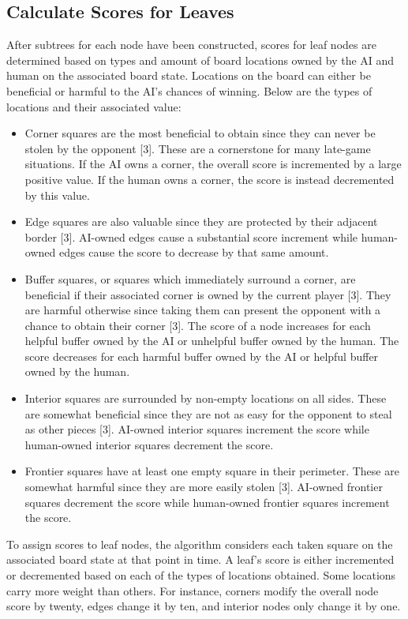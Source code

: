 \documentclass[conference]{IEEEtran}
\begin{document}
\subsection{Calculate Scores for Leaves}
After subtrees for each node have been constructed, scores for leaf nodes are determined based on types and amount of board locations owned by the AI and human on the associated board state. Locations on the board can either be beneficial or harmful to the AI’s chances of winning. Below are the types of locations and their associated value:

\begin{itemize}
\item Corner squares are the most beneficial to obtain since they can never be stolen by the opponent [3]. These are a cornerstone for many late-game situations. If the AI owns a corner, the overall score is incremented by a large positive value. If the human owns a corner, the score is instead decremented by this value.
\item Edge squares are also valuable since they are protected by their adjacent border [3]. AI-owned edges cause a substantial score increment while human-owned edges cause the score to decrease by that same amount.
\item Buffer squares, or squares which immediately surround a corner, are beneficial if their associated corner is owned by the current player [3]. They are harmful otherwise since taking them can present the opponent with a chance to obtain their corner [3]. The score of a node increases for each helpful buffer owned by the AI or unhelpful buffer owned by the human. The score decreases for each harmful buffer owned by the AI or helpful buffer owned by the human.
\item Interior squares are surrounded by non-empty locations on all sides. These are somewhat beneficial since they are not as easy for the opponent to steal as other pieces [3]. AI-owned interior squares increment the score while human-owned interior squares decrement the score.
\item Frontier squares have at least one empty square in their perimeter. These are somewhat harmful since they are more easily stolen [3]. AI-owned frontier squares decrement the score while human-owned frontier squares increment the score.
\end{itemize}

To assign scores to leaf nodes, the algorithm considers each taken square on the associated board state at that point in time. A leaf’s score is either incremented or decremented based on each of the types of locations obtained. Some locations carry more weight than others. For instance, corners modify the overall node score by twenty, edges change it by ten, and interior nodes only change it by one.
\end{document}
